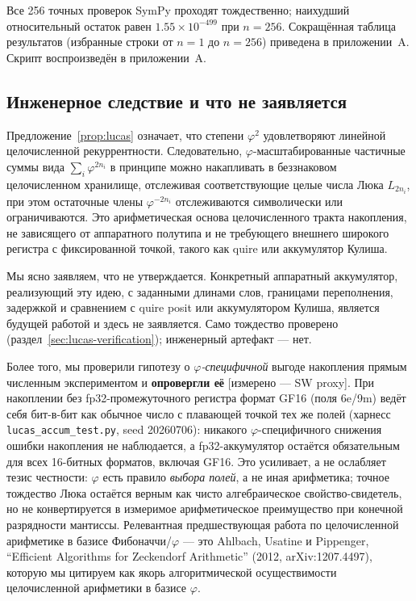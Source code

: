 \documentclass[11pt,a4paper]{article}
\theoremstyle{plain}
\begin{document}
Все 256 точных проверок SymPy проходят тождественно; наихудший относительный
остаток равен \(1.55 \times 10^{-499}\) при \(n = 256\). Сокращённая таблица
результатов (избранные строки от \(n = 1\) до \(n = 256\)) приведена в
приложении~A. Скрипт воспроизведён в приложении~A.

\subsection{Инженерное следствие и что не заявляется}
\label{sec:lucas-engineering}

Предложение~\ref{prop:lucas} означает, что степени \(\varphi^{2}\) удовлетворяют
линейной целочисленной рекуррентности. Следовательно, \(\varphi\)-масштабированные
частичные суммы вида \(\sum_i \varphi^{2 n_i}\) в принципе можно накапливать в
беззнаковом целочисленном хранилище, отслеживая соответствующие целые числа Люка
\(L_{2 n_i}\), при этом остаточные члены \(\varphi^{-2 n_i}\) отслеживаются
символически или ограничиваются. Это арифметическая основа целочисленного тракта
накопления, не зависящего от аппаратного полутипа и не требующего внешнего
широкого регистра с фиксированной точкой, такого как quire или аккумулятор
Кулиша.

Мы ясно заявляем, что не утверждается. Конкретный аппаратный аккумулятор,
реализующий эту идею, с заданными длинами слов, границами переполнения,
задержкой и сравнением с quire posit или аккумулятором Кулиша, является будущей
работой и здесь не заявляется. Само тождество проверено
(раздел~\ref{sec:lucas-verification}); инженерный артефакт --- нет.

Более того, мы проверили гипотезу о \emph{\(\varphi\)-специфичной} выгоде накопления
прямым численным экспериментом и \textbf{опровергли её}
[измерено --- SW proxy]. При накоплении без fp32-промежуточного
регистра формат GF16 (поля 6e/9m) ведёт себя бит-в-бит как
обычное число с плавающей точкой тех же полей (харнесс
\texttt{lucas\_accum\_test.py}, seed 20260706): никакого \(\varphi\)-специфичного
снижения ошибки накопления не наблюдается, а fp32-аккумулятор
остаётся обязательным для всех 16-битных форматов, включая GF16.
Это усиливает, а не ослабляет тезис честности: \(\varphi\) есть правило
\emph{выбора полей}, а не иная арифметика; точное тождество Люка
остаётся верным как чисто алгебраическое свойство-свидетель, но не
конвертируется в измеримое арифметическое преимущество при
конечной разрядности мантиссы.
Релевантная предшествующая работа по целочисленной арифметике в базисе
Фибоначчи/\(\varphi\) --- это Ahlbach, Usatine и Pippenger, ``Efficient
Algorithms for Zeckendorf Arithmetic'' (2012, arXiv:1207.4497), которую мы
цитируем как якорь алгоритмической осуществимости целочисленной арифметики в
базисе \(\varphi\).
\end{document}
